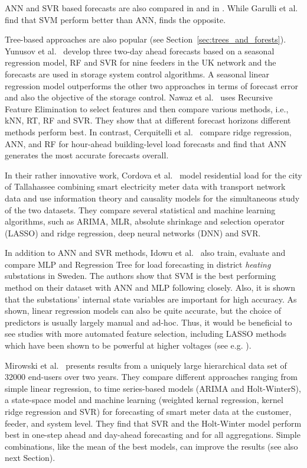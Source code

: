 ANN and SVR based forecasts are also compared in \cite{garulli2015mat} and in \cite{grolinger2016eff}. While Garulli et al.~\cite{garulli2015mat} find that SVM perform better than ANN, \cite{grolinger2016eff} finds the opposite. 

Tree-based approaches are also popular (see Section~\ref{sec:trees_and_forests}). Yunusov et al.~\cite{Yunusov2018sss} develop three two-day ahead forecasts based on a seasonal regression model, RF and SVR for nine feeders in the UK network and the forecasts are used in storage system control algorithms. A seasonal linear regression model outperforms the other two approaches in terms of forecast error and also the objective of the storage control. Nawaz et al.~\cite{nawaz2019aaf} uses Recursive Feature Elimination to select features and then compare various methods, i.e., kNN, RT, RF and SVR. They show that at different forecast horizons different methods perform best. In contrast, Cerquitelli et al.~\cite{Cerquitelli2019esm} compare ridge regression, ANN, and RF for hour-ahead building-level load forecasts and find that ANN generates the most accurate forecasts overall.

In their rather innovative work, Cordova et al.~\cite{Cordova2019cet} model residential load for the city of Tallahassee combining smart electricity meter data with transport network data and use information theory and causality models for the simultaneous study of the two datasets. They compare several statistical and machine learning algorithms, such as ARIMA, MLR, absolute shrinkage and selection operator (LASSO) and ridge regression, deep neural networks (DNN) and SVR.

In addition to ANN and SVR methods, Idowu et al.~\cite{idowu2016aml} also train, evaluate and compare MLP and Regression Tree for load forecasting in district \textit{heating} substations in Sweden. 
The authors show that SVM is the best performing method on their dataset with ANN and MLP following closely. Also, it is shown that the substations' internal state variables are important for high accuracy.
As shown,  linear regression models can also be quite accurate, but the choice of predictors is usually largely manual and ad-hoc. Thus, it would be beneficial to see studies with more automated feature selection, including LASSO methods which have been shown to be powerful at higher voltages (see e.g. \cite{Ziel14}).

Mirowski et al.~\cite{mirowski2014dfi} presents results from a uniquely large hierarchical data set of 32000 end-users over two years. They compare different approaches ranging from simple linear regression, to time series-based models (ARIMA and Holt-WinterS), a state-space model and machine learning (weighted kernal regression, kernel ridge regression and SVR) for forecasting of smart meter data at the customer, feeder, and system level. They find that SVR and the Holt-Winter model perform best in one-step ahead and day-ahead forecasting and for all aggregations. Simple combinations, like the mean of the best models, can improve the results (see also next Section).


